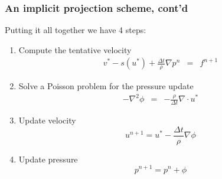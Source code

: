 \begin{frame}
\frametitle{An implicit projection scheme, cont'd}
Putting it all together we have 4 steps: 
\begin{enumerate}
\item Compute the tentative velocity 
\begin{eqnarray*}
v^* - s(u^*) + \frac{\Delta t}{\rho} \nabla p^n &=& f^{n+1}  
\end{eqnarray*}

\item Solve a Poisson problem for the pressure update 
\begin{eqnarray*}
-\nabla^2  \phi &=& -\frac{\rho}{\Delta t} \nabla \cdot u^* 
\end{eqnarray*}
\item Update velocity
\[
u^{n+1} =  u^*- \frac{\Delta t}{\rho} \nabla \phi 
\]

\item Update pressure
\[
p^{n+1} = p^n + \phi 
\]
\end{enumerate}
\end{frame}

